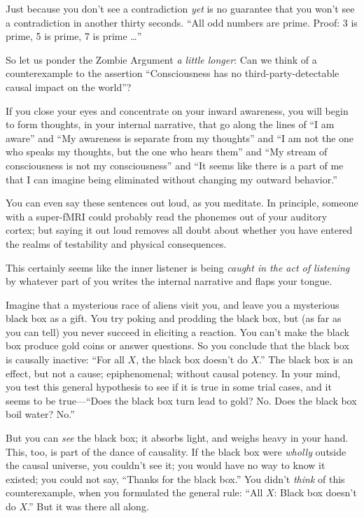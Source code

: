 {
 Just because you don't see a contradiction
\textit{yet} is no guarantee that you won't see a
contradiction in another thirty seconds. ``All odd
numbers are prime. Proof: 3 is prime, 5 is prime, 7 is prime
\ldots''}

{
 So let us ponder the Zombie Argument \textit{a little longer}: Can
we think of a counterexample to the assertion
``Consciousness has no third-party-detectable causal
impact on the world''?}

{
 If you close your eyes and concentrate on your inward awareness,
you will begin to form thoughts, in your internal narrative, that go
along the lines of ``I am aware''
and ``My awareness is separate from my
thoughts'' and ``I am not the one
who speaks my thoughts, but the one who hears them''
and ``My stream of consciousness is not my
consciousness'' and ``It seems like
there is a part of me that I can imagine being eliminated without
changing my outward behavior.''}

{
 You can even say these sentences out loud, as you meditate. In
principle, someone with a super-fMRI could probably read the phonemes
out of your auditory cortex; but saying it out loud removes all doubt
about whether you have entered the realms of testability and physical
consequences.}

{
 This certainly seems like the inner listener is being
\textit{caught in the act of listening} by whatever part of you writes
the internal narrative and flaps your tongue.}

{
 Imagine that a mysterious race of aliens visit you, and leave you
a mysterious black box as a gift. You try poking and prodding the black
box, but (as far as you can tell) you never succeed in eliciting a
reaction. You can't make the black box produce gold
coins or answer questions. So you conclude that the black box is
causally inactive: ``For all $X$, the black box
doesn't do $X$.'' The black box is an
effect, but not a cause; epiphenomenal; without causal potency. In your
mind, you test this general hypothesis to see if it is true in some
trial cases, and it seems to be true---``Does the
black box turn lead to gold? No. Does the black box boil water?
No.''}

{
 But you can \textit{see} the black box; it absorbs light, and
weighs heavy in your hand. This, too, is part of the dance of
causality. If the black box were \textit{wholly} outside the causal
universe, you couldn't see it; you would have no way to
know it existed; you could not say, ``Thanks for the
black box.'' You didn't
\textit{think} of this counterexample, when you formulated the general
rule: ``All $X$: Black box doesn't do
$X$.'' But it was there all along.}

